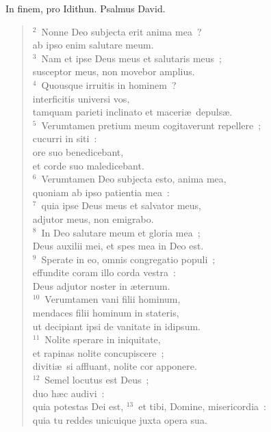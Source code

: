 \lettrine[lines=3,image=true,loversize=0.05,lraise=-0.03]{I}{}n finem, pro Idithun. Psalmus David.
\begin{flushleft}\begin{verse}\vspace{6pt}${}^{2}$~Nonne Deo subjecta erit anima mea~?\\ ab ipso enim salutare meum.\\
${}^{3}$~Nam et ipse Deus meus et salutaris meus~;\\ susceptor meus, non movebor amplius.\\
${}^{4}$~Quousque irruitis in hominem~?\\ interficitis universi vos,\\ tamquam parieti inclinato et maceri\ae\ depuls\ae .\\
${}^{5}$~Verumtamen pretium meum cogitaverunt repellere~;\\ cucurri in siti~:\\ ore suo benedicebant,\\ et corde suo maledicebant.\\
${}^{6}$~Verumtamen Deo subjecta esto, anima mea,\\ quoniam ab ipso patientia mea~:\\
${}^{7}$~quia ipse Deus meus et salvator meus,\\ adjutor meus, non emigrabo.\\
${}^{8}$~In Deo salutare meum et gloria mea~;\\ Deus auxilii mei, et spes mea in Deo est.\\
${}^{9}$~Sperate in eo, omnis congregatio populi~;\\ effundite coram illo corda vestra~:\\ Deus adjutor noster in \ae ternum.\\
${}^{10}$~Verumtamen vani filii hominum,\\ mendaces filii hominum in stateris,\\ ut decipiant ipsi de vanitate in idipsum.\\
${}^{11}$~Nolite sperare in iniquitate,\\ et rapinas nolite concupiscere~;\\ diviti\ae\ si affluant, nolite cor apponere.\\
${}^{12}$~Semel locutus est Deus~;\\ duo h\ae c audivi~:\\ quia potestas Dei est,
${}^{13}$~et tibi, Domine, misericordia~:\\ quia tu reddes unicuique juxta opera sua.\end{verse}\end{flushleft}



